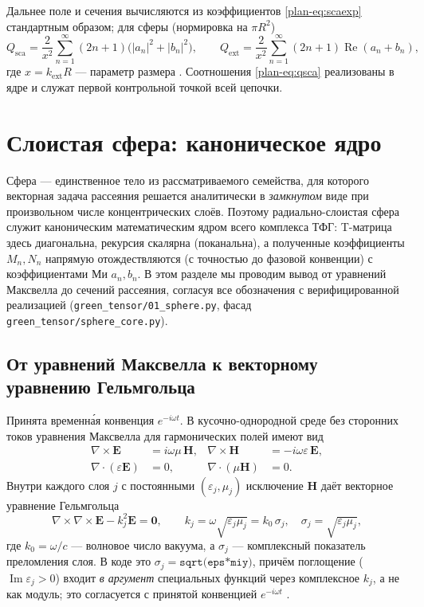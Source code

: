 \documentclass[11pt,a4paper]{article}
\begin{document}
Дальнее поле и сечения вычисляются из коэффициентов \eqref{plan-eq:scaexp} стандартным образом; для сферы (нормировка на $\pi R^2$)
\begin{equation}
Q_{\mathrm{sca}}=\frac{2}{x^2}\sum_{n=1}^{\infty}(2n+1)\big(|a_n|^2+|b_n|^2\big),\qquad
Q_{\mathrm{ext}}=\frac{2}{x^2}\sum_{n=1}^{\infty}(2n+1)\operatorname{Re}(a_n+b_n),
\label{plan-eq:qsca}
\end{equation}
где $x=k_{\mathrm{ext}}R$ --- параметр размера \cite{bohren1983}. Соотношения \eqref{plan-eq:qsca} реализованы в ядре и служат первой контрольной точкой всей цепочки.

\section{Слоистая сфера: каноническое ядро}
\label{sphere-sec:sphere}

Сфера --- единственное тело из рассматриваемого семейства, для которого векторная задача рассеяния решается аналитически в \emph{замкнутом} виде при произвольном числе концентрических слоёв. Поэтому радиально-слоистая сфера служит каноническим математическим ядром всего комплекса ТФГ: T-матрица здесь диагональна, рекурсия скалярна (поканальна), а полученные коэффициенты $M_n,N_n$ напрямую отождествляются (с точностью до фазовой конвенции) с коэффициентами Ми $a_n,b_n$. В этом разделе мы проводим вывод от уравнений Максвелла до сечений рассеяния, согласуя все обозначения с верифицированной реализацией (\texttt{green\_tensor/01\_sphere.py}, фасад \texttt{green\_tensor/sphere\_core.py}).

\subsection{От уравнений Максвелла к векторному уравнению Гельмгольца}

Принята временн\'ая конвенция $e^{-i\omega t}$. В кусочно-однородной среде без сторонних токов уравнения Максвелла для гармонических полей имеют вид \cite{stratton1941,bohren1983}
\begin{align}
\nabla\times\bm{E} &= i\omega\mu\,\bm{H}, &
\nabla\times\bm{H} &= -i\omega\varepsilon\,\bm{E},\\
\nabla\cdot(\varepsilon\bm{E}) &= 0, &
\nabla\cdot(\mu\bm{H}) &= 0.
\end{align}
Внутри каждого слоя $j$ с постоянными $(\varepsilon_j,\mu_j)$ исключение $\bm{H}$ даёт векторное уравнение Гельмгольца
\begin{equation}
\nabla\times\nabla\times\bm{E}-k_j^2\bm{E}=\bm{0},
\qquad
k_j=\omega\sqrt{\varepsilon_j\mu_j}=k_0\,\sigma_j,
\quad
\sigma_j=\sqrt{\varepsilon_j\mu_j},
\label{sphere-eq:helmholtz}
\end{equation}
где $k_0=\omega/c$ --- волновое число вакуума, а $\sigma_j$ --- комплексный показатель преломления слоя. В коде это $\sigma_j=\texttt{sqrt(eps*miy)}$, причём поглощение ($\operatorname{Im}\varepsilon_j>0$) входит \emph{в аргумент} специальных функций через комплексное $k_j$, а не как модуль; это согласуется с принятой конвенцией $e^{-i\omega t}$ \cite{bohren1983}.
\end{document}
